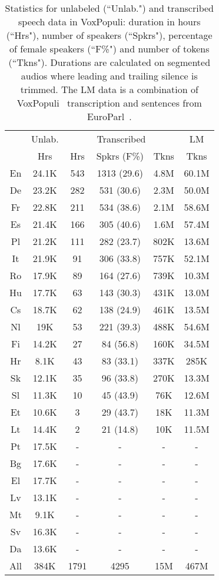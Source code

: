 \documentclass[11pt,a4paper]{article}
\newcommand{\vp}{VoxPopuli}
\begin{document}
\begin{table}[t]
    \centering
    \small
    \begin{tabular}{c|c|ccc|c}
    \toprule
& Unlab. & \multicolumn{3}{c|}{Transcribed} & LM \\
    & Hrs & Hrs & Spkrs (F\%) & Tkns & Tkns \\
    \midrule
    En & 24.1K & 543 & 1313 (29.6) & 4.8M & 60.1M \\
    De & 23.2K & 282 & 531 (30.6) & 2.3M & 50.0M \\
    Fr & 22.8K & 211 & 534 (38.6) & 2.1M & 58.6M \\
    Es & 21.4K & 166 & 305 (40.6) & 1.6M & 57.4M \\
    Pl & 21.2K & 111 & 282 (23.7) & 802K & 13.6M \\
    It & 21.9K & 91 & 306 (33.8) & 757K & 52.1M \\
    Ro & 17.9K & 89 & 164 (27.6) & 739K & 10.3M \\
    Hu & 17.7K & 63 & 143 (30.3) & 431K & 13.0M \\
    Cs & 18.7K & 62 & 138 (24.9) & 461K & 13.5M \\
    Nl & 19K & 53 & 221 (39.3) & 488K & 54.6M \\
    Fi & 14.2K & 27 & 84 (56.8) & 160K & 34.5M \\
    Hr & 8.1K & 43 & 83 (33.1) & 337K & 285K \\
    Sk & 12.1K & 35 & 96 (33.8) & 270K & 13.3M \\
    Sl & 11.3K & 10 & 45 (43.9) & 76K & 12.6M \\
    Et & 10.6K & 3 & 29 (43.7) & 18K & 11.3M \\
    Lt & 14.4K & 2 & 21 (14.8) & 10K & 11.5M \\
    Pt & 17.5K & - & - & - & - \\
    Bg & 17.6K & - & - & - & - \\
    El & 17.7K & - & - & - & - \\
    Lv & 13.1K & - & - & - & - \\
    Mt & 9.1K & - & - & - & - \\
    Sv & 16.3K & - & - & - & - \\
    Da & 13.6K & - & - & - & - \\
    \midrule
    All & 384K & 1791 & 4295 & 15M & 467M \\
\bottomrule
    \end{tabular}
    \caption{Statistics for unlabeled (``Unlab.") and transcribed speech data in \vp: duration in hours (``Hrs"), number of speakers (``Spkrs"), percentage of female speakers (``F\%") and number of tokens (``Tkns"). Durations are calculated on segmented audios where leading and trailing silence is trimmed. The LM data is a combination of \vp~ transcription and sentences from EuroParl~\citep{koehn2005europarl}.}
    \label{tab:unlabeled_transcribed_stats}
\end{table}
\end{document}
